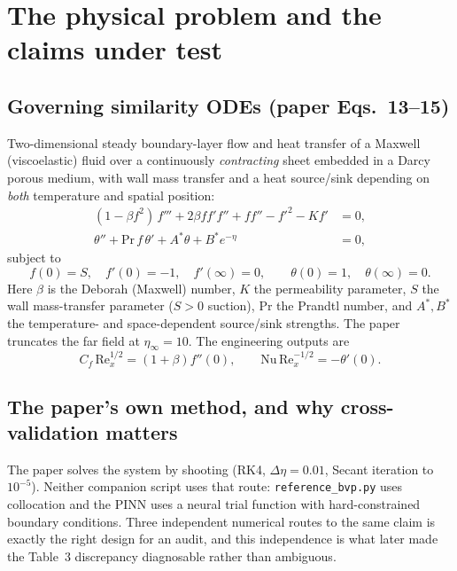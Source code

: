 \documentclass[11pt,a4paper]{article}
\newcommand{\code}[1]{\texttt{\small #1}}
\begin{document}
\section{The physical problem and the claims under test}

\subsection{Governing similarity ODEs (paper Eqs.~13--15)}
Two-dimensional steady boundary-layer flow and heat transfer of a Maxwell (viscoelastic)
fluid over a continuously \emph{contracting} sheet embedded in a Darcy porous medium, with
wall mass transfer and a heat source/sink depending on \emph{both} temperature and spatial
position:
\begin{align}
  (1-\beta f^2)\,f''' + 2\beta f f' f'' + f f'' - f'^2 - K f' &= 0, \label{eq:mom}\\
  \theta'' + \mathrm{Pr}\, f\,\theta' + A^{*}\theta + B^{*}e^{-\eta} &= 0, \label{eq:en}
\end{align}
subject to
\begin{equation}
  f(0)=S,\quad f'(0)=-1,\quad f'(\infty)=0,\qquad \theta(0)=1,\quad \theta(\infty)=0 .
\end{equation}
Here $\beta$ is the Deborah (Maxwell) number, $K$ the permeability parameter, $S$ the wall
mass-transfer parameter ($S>0$ suction), $\mathrm{Pr}$ the Prandtl number, and
$A^{*},B^{*}$ the temperature- and space-dependent source/sink strengths. The paper
truncates the far field at $\eta_\infty=10$. The engineering outputs are
\begin{equation}
  C_f\,\mathrm{Re}_x^{1/2} = (1+\beta) f''(0), \qquad
  \mathrm{Nu}\,\mathrm{Re}_x^{-1/2} = -\theta'(0).
\end{equation}

\subsection{The paper's own method, and why cross-validation matters}
The paper solves the system by shooting (RK4, $\Delta\eta=0.01$, Secant iteration to
$10^{-5}$). Neither companion script uses that route: \code{reference\_bvp.py} uses
collocation and the PINN uses a neural trial function with hard-constrained boundary
conditions. Three independent numerical routes to the same claim is exactly the right
design for an audit, and this independence is what later made the Table~3 discrepancy
diagnosable rather than ambiguous.
\end{document}
